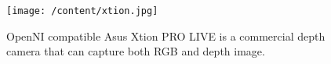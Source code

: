 \begin{figure}
	[h] \centering 
	\texttt{[image: /content/xtion.jpg]} \caption{OpenNI compatible Asus Xtion PRO LIVE is a commercial depth camera that can capture both RGB and depth image. \cite{9} } \label{fg:xtion} 
\end{figure}
